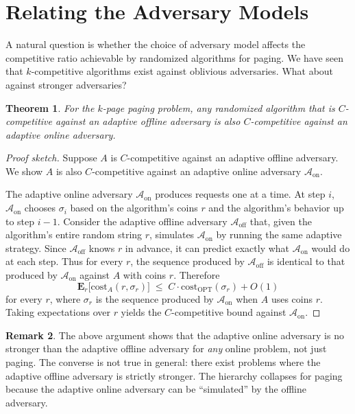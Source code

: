 \documentclass[twoside,12pt]{book}
\theoremstyle{plain}
\newtheorem{theorem}{Theorem}[chapter]
\theoremstyle{definition}
\newtheorem{remark}[theorem]{Remark}
\theoremstyle{remark}
\begin{document}
\section{Relating the Adversary Models}
\label{sec:relating-adversaries}

A natural question is whether the choice of adversary model affects the
competitive ratio achievable by randomized algorithms for paging.  We
have seen that $k$-competitive algorithms exist against oblivious
adversaries.  What about against stronger adversaries?

\begin{theorem}\label{thm:paging-adversary-equivalence}
For the $k$-page paging problem, any randomized algorithm that is
$C$-competitive against an adaptive offline adversary is also
$C$-competitive against an adaptive online adversary.
\end{theorem}

\begin{proof}[Proof sketch]
Suppose $A$ is $C$-competitive against an adaptive offline adversary.
We show $A$ is also $C$-competitive against an adaptive online adversary
$\mathcal{A}_{\mathrm{on}}$.

The adaptive online adversary $\mathcal{A}_{\mathrm{on}}$ produces
requests one at a time.  At step $i$, $\mathcal{A}_{\mathrm{on}}$
chooses $\sigma_i$ based on the algorithm's coins $r$ and the algorithm's
behavior up to step $i-1$.  Consider the adaptive offline adversary
$\mathcal{A}_{\mathrm{off}}$ that, given the algorithm's entire random
string $r$, simulates $\mathcal{A}_{\mathrm{on}}$ by running the same
adaptive strategy.  Since $\mathcal{A}_{\mathrm{off}}$ knows $r$ in
advance, it can predict exactly what $\mathcal{A}_{\mathrm{on}}$ would
do at each step.  Thus for every $r$, the sequence produced by
$\mathcal{A}_{\mathrm{off}}$ is identical to that produced by
$\mathcal{A}_{\mathrm{on}}$ against $A$ with coins $r$.  Therefore
\[
  \mathbf{E}_r\!\bigl[\mathrm{cost}_A(r, \sigma_r)\bigr] \;\le\; C \cdot \mathrm{cost}_{\mathrm{OPT}}(\sigma_r) + O(1)
\]
for every $r$, where $\sigma_r$ is the sequence produced by
$\mathcal{A}_{\mathrm{on}}$ when $A$ uses coins $r$.  Taking
expectations over $r$ yields the $C$-competitive bound against
$\mathcal{A}_{\mathrm{on}}$.
\end{proof}

\begin{remark}
The above argument shows that the adaptive online adversary is no
stronger than the adaptive offline adversary for \emph{any} online
problem, not just paging.  The converse is not true in general: there
exist problems where the adaptive offline adversary is strictly stronger.
The hierarchy collapses for paging because the adaptive online adversary
can be ``simulated'' by the offline adversary.
\end{remark}
\end{document}
